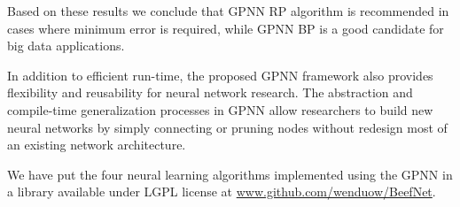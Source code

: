 \documentclass[procedia]{easychair}
\begin{document}
Based on these results we conclude that GPNN RP algorithm is recommended in cases where minimum error is required, while GPNN BP is a good candidate for big data applications.

In addition to efficient run-time, the proposed GPNN framework also provides flexibility and reusability for neural network research.  The abstraction and compile-time generalization processes in GPNN allow researchers to build new neural networks by simply connecting or pruning nodes without redesign most of an existing network architecture.

We have put the four neural learning algorithms implemented using the GPNN in a library available under LGPL license at \url{www.github.com/wenduow/BeefNet}.






\end{document}
